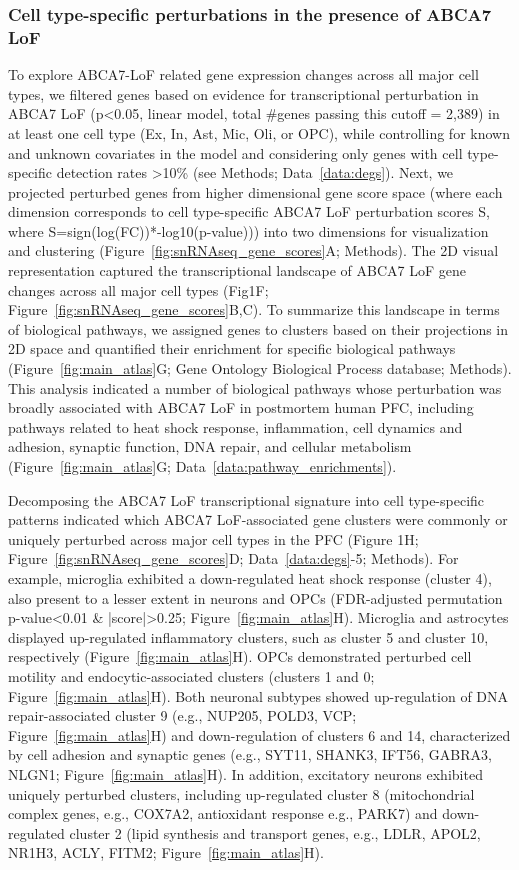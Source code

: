 \subsubsection{Cell type-specific perturbations in the presence of ABCA7 LoF}
To explore ABCA7-LoF related gene expression changes across all major cell types, we filtered genes based on evidence for transcriptional perturbation in ABCA7 LoF (p<0.05, linear model, total #genes passing this cutoff = 2,389) in at least one cell type (Ex, In, Ast, Mic, Oli, or OPC), while controlling for known and unknown covariates in the model and considering only genes with cell type-specific detection rates >10\% (see Methods; Data~\ref{data:degs}). Next, we projected perturbed genes from higher dimensional gene score space (where each dimension corresponds to cell type-specific ABCA7 LoF perturbation scores S, where S=sign(log(FC))*-log10(p-value))) into two dimensions for visualization and clustering (Figure~\ref{fig:snRNAseq_gene_scores}A; Methods). 
The 2D visual representation captured the transcriptional landscape of ABCA7 LoF gene changes across all major cell types (Fig1F; Figure~\ref{fig:snRNAseq_gene_scores}B,C). To summarize this landscape in terms of biological pathways, we assigned genes to clusters based on their projections in 2D space and quantified their enrichment for specific biological pathways (Figure~\ref{fig:main_atlas}G; Gene Ontology Biological Process database; Methods). This analysis indicated a number of biological pathways whose perturbation was broadly associated with ABCA7 LoF in postmortem human PFC, including pathways related to heat shock response, inflammation, cell dynamics and adhesion, synaptic function, DNA repair, and cellular metabolism (Figure~\ref{fig:main_atlas}G; Data~\ref{data:pathway_enrichments}). 

Decomposing the ABCA7 LoF transcriptional signature into cell type-specific patterns indicated which ABCA7 LoF-associated gene clusters were commonly or uniquely perturbed across major cell types in the PFC (Figure 1H; Figure~\ref{fig:snRNAseq_gene_scores}D; Data~\ref{data:degs}-5; Methods). For example, microglia exhibited a down-regulated heat shock response (cluster 4), also present to a lesser extent in neurons and OPCs (FDR-adjusted permutation p-value<0.01 & |score|>0.25; Figure~\ref{fig:main_atlas}H). Microglia and astrocytes displayed up-regulated inflammatory clusters, such as cluster 5 and cluster 10, respectively (Figure~\ref{fig:main_atlas}H). OPCs demonstrated perturbed cell motility and endocytic-associated clusters (clusters 1 and 0; Figure~\ref{fig:main_atlas}H). Both neuronal subtypes showed up-regulation of DNA repair-associated cluster 9 (e.g., NUP205, POLD3, VCP; Figure~\ref{fig:main_atlas}H) and down-regulation of clusters 6 and 14, characterized by cell adhesion and synaptic genes (e.g., SYT11, SHANK3, IFT56, GABRA3, NLGN1; Figure~\ref{fig:main_atlas}H). In addition, excitatory neurons exhibited uniquely perturbed clusters, including up-regulated cluster 8 (mitochondrial complex genes, e.g., COX7A2, antioxidant response e.g., PARK7) and down-regulated cluster 2 (lipid synthesis and transport genes, e.g., LDLR, APOL2, NR1H3, ACLY, FITM2; Figure~\ref{fig:main_atlas}H).

